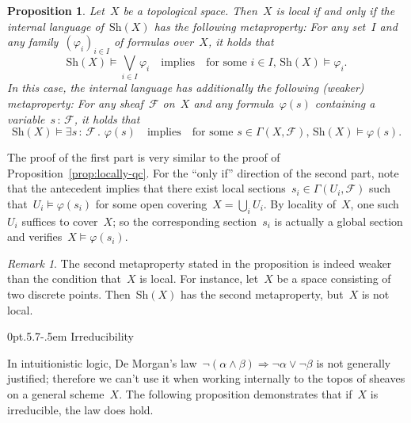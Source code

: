 \documentclass[10pt,reqno,a4paper]{amsbook}
\makeatletter
\theoremstyle{definition}
\theoremstyle{plain}
\newtheorem{prop}[defn]{Proposition}
\theoremstyle{remark}
\newtheorem{rem}[defn]{Remark}
\newcommand{\F}{\mathcal{F}}
\newcommand{\Sh}{\mathrm{Sh}}
\newcommand{\?}{\,{:}\,}
\renewcommand{\_}{\mathpunct{.}\,}
\renewenvironment{proof}[1][\proofname]{\par
  \pushQED{\qed}%
  \normalfont \topsep6\p@\@plus6\p@\relax
  \trivlist
  \item[\hskip\labelsep
        \itshape
    #1\@addpunct{.}]\ignorespaces
}{%
  \popQED\endtrivlist\@endpefalse
}
\def\subsection{\@startsection{subsection}{2}%
  {0pt}{.5\linespacing\@plus.7\linespacing}{-.5em}%
  {\normalfont\bfseries}}
\makeatother
\begin{document}
\begin{prop}\label{prop:local-meta}Let~$X$ be a topological space. Then~$X$ is local if and
only if the internal language of~$\Sh(X)$ has the following metaproperty:
For any set~$I$ and any family~$(\varphi_i)_{i \in I}$ of
formulas over~$X$, it holds that
\[ \Sh(X) \models \bigvee_{i \in I} \varphi_i
  \quad\text{implies}\quad
  \text{for some~$i \in I$, $\Sh(X) \models \varphi_i$}. \]
In this case, the internal language has additionally the following (weaker) metaproperty: For any
sheaf~$\F$ on~$X$ and any formula~$\varphi(s)$ containing a variable~$s\?\F$,
it holds that
\[ \Sh(X) \models \exists s\?\F\_ \varphi(s)
  \quad\text{implies}\quad
  \text{for some~$s \in \Gamma(X,\F)$, $\Sh(X) \models \varphi(s)$}. \]
\end{prop}
\begin{proof}The proof of the first part is very similar to the proof of
Proposition~\ref{prop:locally-qc}. For the ``only if'' direction of the second part, note
that the antecedent implies that there exist local sections~$s_i \in
\Gamma(U_i,\F)$ such that~$U_i \models \varphi(s_i)$ for some open covering~$X
= \bigcup_i U_i$. By locality of~$X$, one such~$U_i$ suffices to cover~$X$; so
the corresponding section~$s_i$ is actually a global section and verifies~$X
\models \varphi(s_i)$.
\end{proof}

\begin{rem}The second metaproperty stated in the proposition is indeed weaker
than the condition that~$X$ is local. For instance, let~$X$ be a space consisting
of two discrete points. Then~$\Sh(X)$ has the second metaproperty, but~$X$ is
not local.\end{rem}


\subsection{Irreducibility}

In intuitionistic logic, De Morgan's law~$\neg(\alpha \wedge \beta)
\Rightarrow \neg\alpha \vee \neg\beta$ is not generally justified; therefore we
can't use it when working internally to the topos of sheaves on a general scheme~$X$.
The following proposition demonstrates that if~$X$ is irreducible, the law
does hold.
\end{document}
